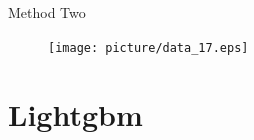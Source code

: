 \documentclass[
 size=14pt,
 paper=smartboard,  %
 mode=present, 		%
 display=slides, 	%
 style=tuliplab,  	%
 pauseslide,
 fleqn,leqno]{powerdot}
\begin{document}
\begin{slide}[toc=,bm=]{Method Two}
  \begin{figure}
    \texttt{[image: picture/data\_17.eps]}
  \end{figure}
\end{slide}

\section{Lightgbm}
\end{document}
